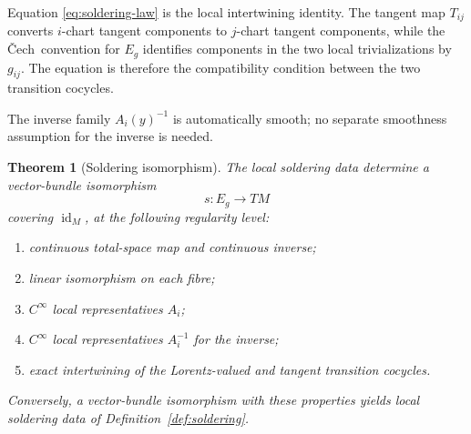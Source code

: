 \documentclass[11pt,a4paper]{article}
\newtheorem{theorem}{Theorem}[section]
\theoremstyle{definition}
\theoremstyle{remark}
\newcommand{\id}{\operatorname{id}}
\newcommand{\Cech}{\ifmmode\text{\v{C}ech}\else\v{C}ech\fi}
\begin{document}
Equation \eqref{eq:soldering-law} is the local intertwining identity.
The tangent map \(T_{ij}\) converts \(i\)-chart tangent components to
\(j\)-chart tangent components, while the \Cech\ convention for \(E_g\) identifies components in the two local
trivializations by \(g_{ij}\).  The equation is therefore the compatibility
condition between the two transition cocycles.

The inverse family \(A_i(y)^{-1}\) is automatically smooth; no separate smoothness assumption for the inverse is needed.

\begin{theorem}[Soldering isomorphism]
\label{thm:bundle-equivalence}
The local soldering data determine a vector-bundle isomorphism
\[
   s:E_g\longrightarrow TM
\]
covering \(\id_M\), at the following regularity level:
\begin{enumerate}
\item continuous total-space map and continuous inverse;
\item linear isomorphism on each fibre;
\item \(C^\infty\) local representatives \(A_i\);
\item \(C^\infty\) local representatives \(A_i^{-1}\) for the inverse;
\item exact intertwining of the Lorentz-valued and tangent transition cocycles.
\end{enumerate}
Conversely, a vector-bundle isomorphism with these properties yields local soldering data of Definition~\ref{def:soldering}.
\end{theorem}
\end{document}
